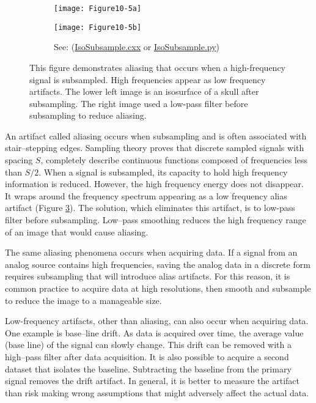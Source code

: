 \begin{figure}[htb]
	\begin{subfigure}[h]{0.96\linewidth}
		\texttt{[image: Figure10-5a]}
		\captionsetup{justification=centering}
		\caption*{}
		\label{fig:Figure10-5a}
	\end{subfigure}
	\hfill
	\begin{subfigure}[h]{0.96\linewidth}
		\texttt{[image: Figure10-5b]}
		\captionsetup{justification=centering}
		\caption*{See: (\href{https://lorensen.github.io/VTKExamples/site/Cxx/ImageProcessing/IsoSubsample/}{IsoSubsample.cxx} or \href{https://lorensen.github.io/VTKExamples/site/Python/ImageProcessing/IsoSubsample/}{IsoSubsample.py})}
		\label{fig:Figure10-5b}
	\end{subfigure}
	\caption{This figure demonstrates aliasing that occurs when a high-frequency signal is subsampled. High frequencies appear as low frequency artifacts. The lower left image is an isosurface of a skull after subsampling. The right image used a low-pass filter before subsampling to reduce aliasing.}\label{fig:Figure10-5}
\end{figure}

An artifact called aliasing occurs when subsampling and is often associated with stair--stepping edges. Sampling theory proves that discrete sampled signals with spacing $S$, completely describe continuous functions composed of frequencies less than $S / 2$. When a signal is subsampled, its capacity to hold high frequency information is reduced. However, the high frequency energy does not disappear. It wraps around the frequency spectrum appearing as a low frequency alias artifact (Figure \ref{fig:Figure10-5}). The solution, which eliminates this artifact, is to low-pass filter before subsampling. Low--pass smoothing reduces the high frequency range of an image that would cause aliasing.

The same aliasing phenomena occurs when acquiring data. If a signal from an analog source contains high frequencies, saving the analog data in a discrete form requires subsampling that will introduce alias artifacts. For this reason, it is common practice to acquire data at high resolutions, then smooth and subsample to reduce the image to a manageable size.

Low-frequency artifacts, other than aliasing, can also occur when acquiring data. One example is base--line drift. As data is acquired over time, the average value (base line) of the signal can slowly change. This drift can be removed with a high--pass filter after data acquisition. It is also possible to acquire a second dataset that isolates the baseline. Subtracting the baseline from the primary signal removes the drift artifact. In general, it is better to measure the artifact than risk making wrong assumptions that might adversely affect the actual data.

